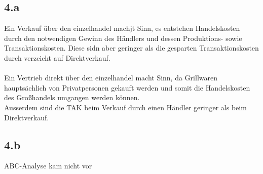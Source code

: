 \subsection{4.a}
    Ein Verkauf über den einzelhandel machjt Sinn, es entstehen Handelskosten durch den notwendigen Gewinn des Händlers und dessen Produktions- sowie Transaktionskosten. Diese sidn aber geringer als die gesparten Transaktionskosten durch verzeicht auf Direktverkauf. \\
    \ \\
    Ein Vertrieb direkt über den einzelhandel macht Sinn, da Grillwaren hauptsächlich von Privatpersonen gekauft werden und somit die Handelskosten des Großhandels umgangen werden können. \\
    Ausserdem sind die TAK beim Verkauf durch einen Händler geringer als beim Direktverkauf.

\subsection{4.b}
    ABC-Analyse kam nicht vor